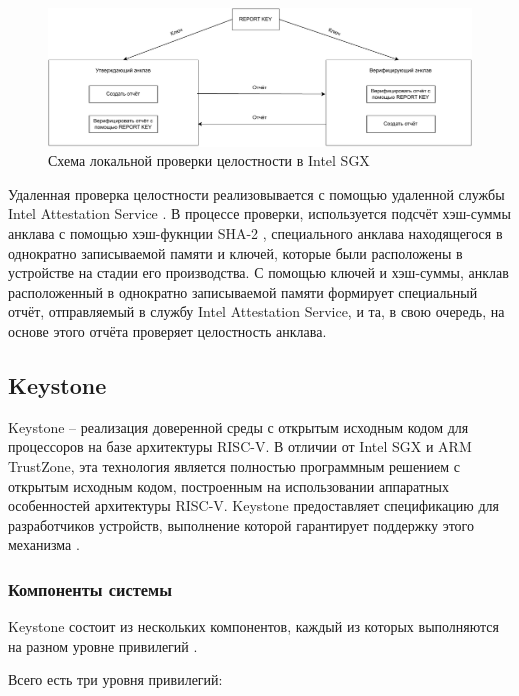 \begin{figure}[h]
	\centering
	\includegraphics[width=\textwidth]{img/enclave-local-attestation.pdf}
	\caption{Схема локальной проверки целостности в Intel SGX}
	\label{fig:enclave-local-attestation}
\end{figure}

Удаленная проверка целостности реализовывается с помощью удаленной службы Intel Attestation Service \cite{intel-attestation-service}. В процессе проверки, используется подсчёт хэш-суммы анклава с помощью хэш-фукнции SHA-2 \cite{sha2}, специального анклава находящегося в однократно записываемой памяти и ключей, которые были расположены в устройстве на стадии его производства. С помощью ключей и хэш-суммы, анклав расположенный в однократно записываемой памяти формирует специальный отчёт, отправляемый в службу Intel Attestation Service, и та, в свою очередь, на основе этого отчёта проверяет целостность анклава.

\subsection{Keystone}

Keystone -- реализация доверенной среды с открытым исходным кодом для процессоров на базе архитектуры RISC-V. В отличии от Intel SGX и ARM TrustZone, эта технология является полностью программным решением с открытым исходным кодом, построенным на использовании аппаратных особенностей архитектуры RISC-V. Keystone предоставляет спецификацию для разработчиков устройств, выполнение которой гарантирует поддержку этого механизма \cite{riscv-keystone}.

\subsubsection{Компоненты системы}

Keystone состоит из нескольких компонентов, каждый из которых выполняются на разном уровне привилегий \cite{keystone-overview}.

Всего есть три уровня привилегий:

